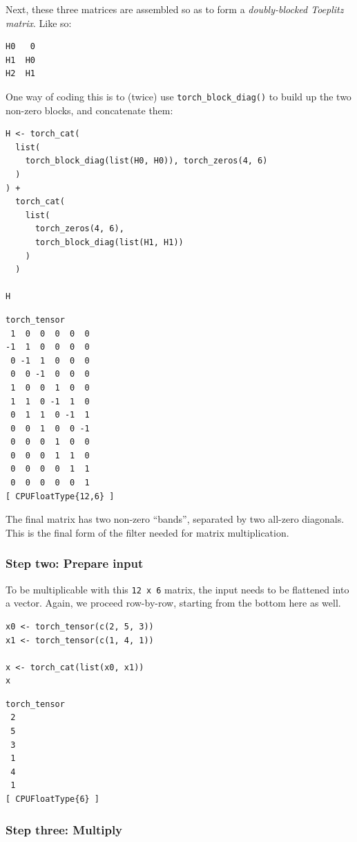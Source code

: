 \documentclass[
  letterpaper,
]{krantz}
\begin{document}
Next, these three matrices are assembled so as to form a
\emph{doubly-blocked Toeplitz} \emph{matrix}. Like so:

\begin{verbatim}
H0   0
H1  H0
H2  H1
\end{verbatim}

One way of coding this is to (twice) use \texttt{torch\_block\_diag()}
to build up the two non-zero blocks, and concatenate them:

\begin{verbatim}
H <- torch_cat(
  list(
    torch_block_diag(list(H0, H0)), torch_zeros(4, 6)
  )
) +
  torch_cat(
    list(
      torch_zeros(4, 6),
      torch_block_diag(list(H1, H1))
    )
  )

H
\end{verbatim}

\begin{verbatim}
torch_tensor
 1  0  0  0  0  0
-1  1  0  0  0  0
 0 -1  1  0  0  0
 0  0 -1  0  0  0
 1  0  0  1  0  0
 1  1  0 -1  1  0
 0  1  1  0 -1  1
 0  0  1  0  0 -1
 0  0  0  1  0  0
 0  0  0  1  1  0
 0  0  0  0  1  1
 0  0  0  0  0  1
[ CPUFloatType{12,6} ]
\end{verbatim}

The final matrix has two non-zero ``bands'', separated by two all-zero
diagonals. This is the final form of the filter needed for matrix
multiplication.

\hypertarget{step-two-prepare-input}{%
\subsubsection{Step two: Prepare input}\label{step-two-prepare-input}}

To be multiplicable with this \texttt{12\ x\ 6} matrix, the input needs
to be flattened into a vector. Again, we proceed row-by-row, starting
from the bottom here as well.

\begin{verbatim}
x0 <- torch_tensor(c(2, 5, 3)) 
x1 <- torch_tensor(c(1, 4, 1))

x <- torch_cat(list(x0, x1))
x
\end{verbatim}

\begin{verbatim}
torch_tensor
 2
 5
 3
 1
 4
 1
[ CPUFloatType{6} ]
\end{verbatim}

\hypertarget{step-three-multiply}{%
\subsubsection{Step three: Multiply}\label{step-three-multiply}}
\end{document}
